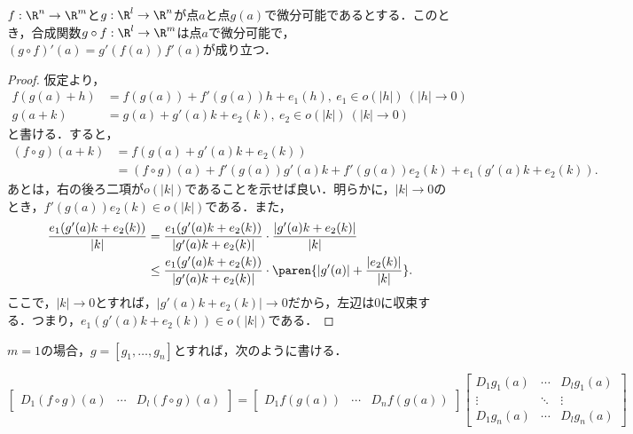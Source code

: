 \documentclass[a4paper,10pt]{ltjsarticle}
\begin{document}
\begin{MyProposition}
  \(f:\R^n\to\R^m\)と\(g:\R^l\to\R^n\)が点\(a\)と点\(g(a)\)で微分可能であるとする．このとき，合成関数\(g\circ f:\R^l\to\R^m\)は点\(a\)で微分可能で，\((g\circ f)'(a) = g'(f(a))f'(a)\)が成り立つ．
\end{MyProposition}
\begin{proof}
  仮定より，
  \begin{align*}
    f(g(a) + h) & = f(g(a)) + f'(g(a))h + e_1(h), \ e_1 \in o(|h|) \ (|h| \to 0) \\
    g(a + k)    & = g(a) + g'(a)k + e_2(k), \ e_2 \in o(|k|) \ (|k| \to 0)
  \end{align*}
  と書ける．すると，
  \begin{align*}
    (f\circ g)(a + k) & = f(g(a) + g'(a)k + e_2(k))                                                       \\
                       & = (f\circ g)(a) + f'(g(a))g'(a)k + f'(g(a))e_2(k) + e_1(g'(a)k + e_2(k)).
  \end{align*}
  あとは，右の後ろ二項が\(o(|k|)\)であることを示せば良い．明らかに，\(|k| \to 0\)のとき，\(f'(g(a))e_2(k) \in o(|k|)\)である．また，
  \begin{align*}
    \frac{e_1(g'(a)k + e_2(k))}{|k|} & = \frac{e_1(g'(a)k + e_2(k))}{|g'(a)k + e_2(k)|} \cdot \frac{|g'(a)k + e_2(k)|}{|k|}         \\
                                    & \le \frac{e_1(g'(a)k + e_2(k))}{|g'(a)k + e_2(k)|} \cdot \paren{|g'(a)| + \frac{|e_2(k)|}{|k|}}.
  \end{align*}
  ここで，\(|k| \to 0\)とすれば，\(|g'(a)k + e_2(k)| \to 0\)だから，左辺は\(0\)に収束する．つまり，\(e_1(g'(a)k + e_2(k)) \in o(|k|)\)である．
\end{proof}

\(m = 1\)の場合，\(g = [g_1, \dots, g_n]\)とすれば，次のように書ける．

\[
  \begin{bmatrix}
    D_1(f\circ g)(a) & \cdots & D_l(f\circ g)(a)
  \end{bmatrix}
  = \begin{bmatrix}
    D_1f(g(a)) & \cdots & D_nf(g(a))
  \end{bmatrix}
  \begin{bmatrix}
    D_1g_1(a) & \cdots & D_lg_1(a) \\
    \vdots        & \ddots & \vdots        \\
    D_1g_n(a) & \cdots & D_lg_n(a)
  \end{bmatrix}
\]
\end{document}
